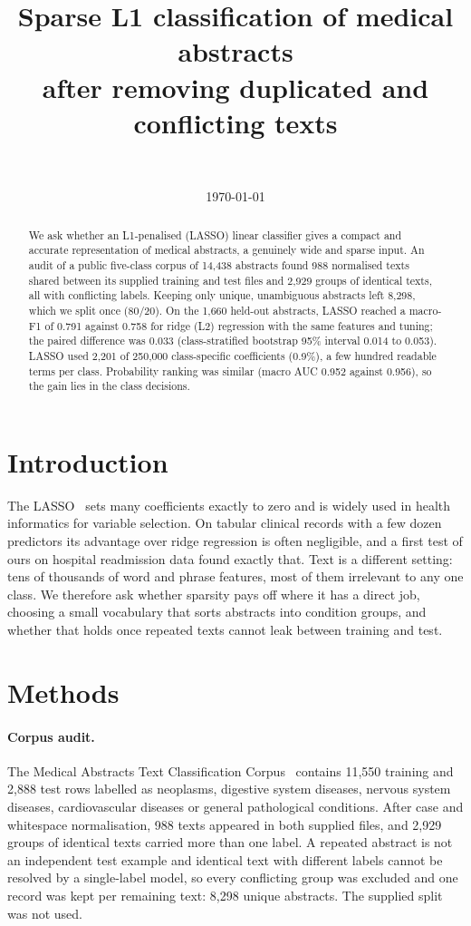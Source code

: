 \documentclass[11pt]{article}
\title{Sparse L1 classification of medical abstracts\\ after removing duplicated and conflicting texts}
\author{\authorname\\ \small \affiliation}
\date{\today}
\begin{document}
\maketitle

\begin{abstract}
We ask whether an L1-penalised (LASSO) linear classifier gives a compact and accurate representation of medical
abstracts, a genuinely wide and sparse input. An audit of a public five-class corpus of 14,438 abstracts found 988
normalised texts shared between its supplied training and test files and 2,929 groups of identical texts, all with
conflicting labels. Keeping only unique, unambiguous abstracts left 8,298, which we split once (80/20). On the 1,660
held-out abstracts, LASSO reached a macro-F1 of 0.791 against 0.758 for ridge (L2) regression with the same features
and tuning; the paired difference was 0.033 (class-stratified bootstrap 95\% interval 0.014 to 0.053). LASSO used
2,201 of 250,000 class-specific coefficients (0.9\%), a few hundred readable terms per class. Probability ranking was
similar (macro AUC 0.952 against 0.956), so the gain lies in the class decisions.
\end{abstract}

\section{Introduction}
The LASSO~\cite{tibshirani1996} sets many coefficients exactly to zero and is widely used in health informatics for
variable selection. On tabular clinical records with a few dozen predictors its advantage over ridge regression is
often negligible, and a first test of ours on hospital readmission data found exactly that. Text is a different
setting: tens of thousands of word and phrase features, most of them irrelevant to any one class. We therefore ask
whether sparsity pays off where it has a direct job, choosing a small vocabulary that sorts abstracts into condition
groups, and whether that holds once repeated texts cannot leak between training and test.

\section{Methods}
\paragraph{Corpus audit.} The Medical Abstracts Text Classification Corpus~\cite{schopf2023,corpus} contains 11,550
training and 2,888 test rows labelled as neoplasms, digestive system diseases, nervous system diseases,
cardiovascular diseases or general pathological conditions. After case and whitespace normalisation, 988 texts
appeared in both supplied files, and 2,929 groups of identical texts carried more than one label. A repeated
abstract is not an independent test example and identical text with different labels cannot be resolved by a
single-label model, so every conflicting group was excluded and one record was kept per remaining text: 8,298
unique abstracts. The supplied split was not used.
\end{document}
